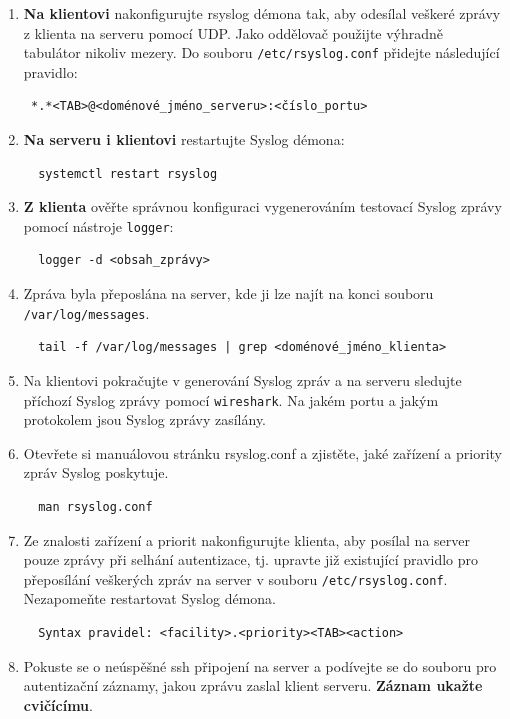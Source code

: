 \begin{itemize}
\begin{enumerate}
            \item {\bf Na klientovi} nakonfigurujte rsyslog démona tak, aby odesílal veškeré zprávy
         z klienta na serveru pomocí UDP. Jako oddělovač použijte výhradně tabulátor nikoliv mezery.
         Do souboru {\tt /etc/rsyslog.conf} přidejte následující pravidlo:
\begin{verbatim} 
 *.*<TAB>@<doménové_jméno_serveru>:<číslo_portu>
\end{verbatim}

            \item {\bf Na serveru i klientovi} restartujte Syslog démona: 
\begin{verbatim}
  systemctl restart rsyslog
\end{verbatim} 

            \item {\bf Z klienta} ověřte správnou konfiguraci vygenerováním testovací Syslog 
         zprávy pomocí nástroje {\tt logger}:
\begin{verbatim} 
  logger -d <obsah_zprávy>
\end{verbatim} 
        
            \item Zpráva byla přeposlána na server, kde ji lze najít na konci souboru
         {\tt /var/log/messages}.

\begin{verbatim} 
  tail -f /var/log/messages | grep <doménové_jméno_klienta>
\end{verbatim} 

            \item  Na klientovi pokračujte v generování Syslog zpráv a 
         na serveru sledujte příchozí Syslog zprávy pomocí {\tt wireshark}. Na jakém
         portu a jakým protokolem jsou Syslog zprávy zasílány.
         
         

            \item Otevřete si manuálovou stránku rsyslog.conf a zjistěte, jaké zařízení a priority
         zpráv Syslog poskytuje. 
\begin{verbatim} 
  man rsyslog.conf
\end{verbatim} 
        
         \item Ze znalosti zařízení a priorit nakonfigurujte klienta, aby posílal na server 
         pouze zprávy při selhání autentizace, tj. upravte již existující pravidlo pro přeposílání
         veškerých zpráv na server v souboru {\tt /etc/rsyslog.conf}. Nezapomeňte restartovat Syslog démona. 
         
\begin{verbatim} 
  Syntax pravidel: <facility>.<priority><TAB><action>
\end{verbatim} 
         \item Pokuste se o neúspěšné ssh připojení na server a podívejte se do souboru pro autentizační záznamy, jakou zprávu zaslal klient serveru. {\bf Záznam ukažte cvičícímu}.

       \end{enumerate}
   \end{itemize}

